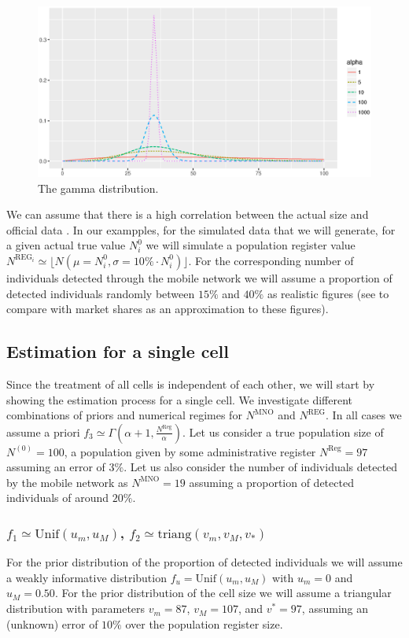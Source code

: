 \documentclass[12pt, a4paper]{article}
\begin{document}
\begin{figure}
	\centering
	\includegraphics[scale=0.75]{gamma.eps}
	\caption{The gamma distribution.}
	\label{gamma}
\end{figure}

We can assume that there is a high correlation between the actual size and official data \cite{Q2016}.
In our exampples, for the simulated data that we will generate, for a given actual true 
value $N^{0}_{i}$ we will simulate a population register value $N^{\textrm{REG}_{i}}\simeq \lfloor N(\mu = N^{0}_{i}, \sigma = 10\%\cdot N^{0}_{i})\rfloor$. For the corresponding number of individuals detected through the mobile network we will assume a proportion 
of detected individuals randomly between $15\%$ and $40\%$ as realistic figures (see  \cite{WP5Del11} to compare 
with market shares as an approximation to these figures).

\subsection{Estimation for a single cell}

Since the treatment of all cells is independent of each other, we will start by showing the 
estimation process for a single cell. We investigate different combinations of priors and 
numerical regimes for $N^{\textrm{MNO}}$ and $N^{\textrm{REG}}$. In all cases we assume a 
priori $f_{3}\simeq\Gamma\left(\alpha + 1, \frac{N^{\textrm{Reg}}}{\alpha}\right)$.
Let us consider a true population size of $N^{(0)} = 100$, a population given by some administrative register
$N^{\textrm{Reg}}=97$ assuming an error of $3\%$. 
Let us also consider the number of individuals detected by the mobile network as $N^{\textrm{MNO}} = 19$ 
assuming a proportion of detected individuals of around $20\%$.

\subsubsection{$f_{1}\simeq\textrm{Unif}(u_{m}, u_{M})$, $f_{2}\simeq\textrm{triang}(v_{m}, v_{M}, v_{*})$}
For the prior distribution of the proportion 
of detected individuals we will assume a weakly informative distribution 
$f_{u}=\textrm{Unif}(u_{m}, u_{M})$ with $u_{m}=0$ and $u_{M}=0.50$. For the prior 
distribution of the cell size we will assume a triangular distribution with 
parameters $v_{m}=87$, $v_{M}=107$, and $v^{*}=97$, assuming an (unknown) error of $10\%$ over 
the population register size.
\end{document}
